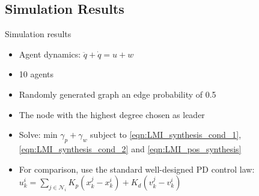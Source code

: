 \subsection{Simulation Results}
\begin{frame}{Simulation results}
\begin{itemize}
\item Agent dynamics: $\ddot{q}+\dot{q}=u+w$
\item 10 agents
\item Randomly generated graph an edge probability of 0.5
\item The node with the highest degree chosen as leader
\item Solve: min $\gamma_p + \gamma_w$ subject to \eqref{eqn:LMI_synthesis_cond_1}, \eqref{eqn:LMI_synthesis_cond_2} and \eqref{eqn:LMI_pos_synthesis}
\item For comparison, use the standard well-designed PD control law:
$u_k^i=\sum_{j\in\mathcal{N}_i}K_p(x_k^j-x_k^i)+K_d(v_k^j-v_k^i)$
\end{itemize}
\end{frame}
%	
%			
%			
%	
